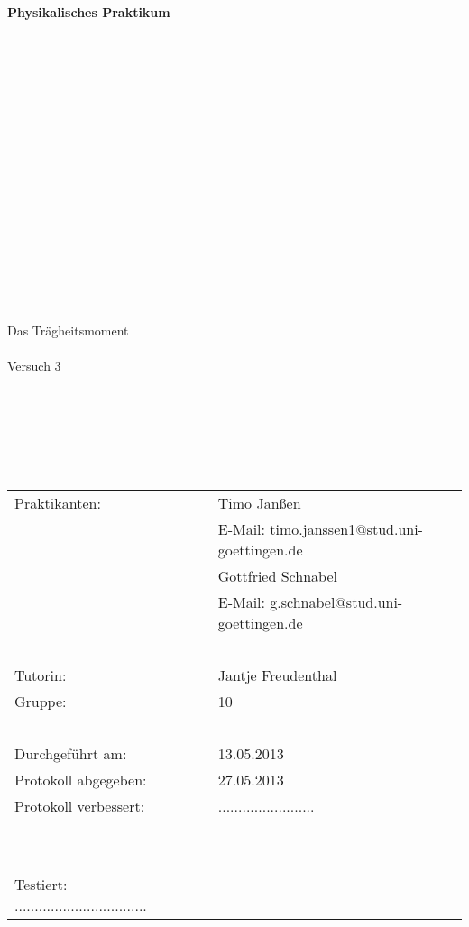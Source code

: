 \begin{center}
    {\Huge{\textbf{Physikalisches Praktikum}}}\\[16pt]
\ \\
\ \\
\ \\
\ \\
\ \\
\ \\
\ \\
\ \\
\ \\
\ \\
\ \\
\ \\
\ \\
\ \\
\ \\
\ \\
\ \\
\huge{Das Trägheitsmoment}
\ \\
\ \\
\large{Versuch 3}
\end{center}

\normalsize
\ \\
\ \\
\ \\
\ \\
\ \\

\begin{center}
\begin{tabular}{lcl}
      Praktikanten: & ~ & Timo Janßen \\
                    & ~ & E-Mail: timo.janssen1@stud.uni-goettingen.de \\
		    & ~ & Gottfried Schnabel \\
		    & ~ & E-Mail: g.schnabel@stud.uni-goettingen.de \\
\ \\		    
      Tutorin: & ~ & Jantje Freudenthal \\
      Gruppe: & ~ & 10 \\
\ \\      
      Durchgeführt am: & ~ & 13.05.2013 \\
      Protokoll abgegeben: & ~ & 27.05.2013 \\
      Protokoll verbessert: & ~ & ........................\\
\ \\
\ \\
      Testiert: .................................    
\end{tabular}\\
\end{center}

